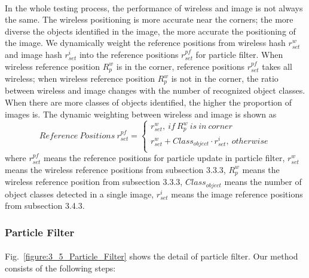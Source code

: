 \documentclass[a4paper,12pt]{report}
\begin{document}
\paragraph{}
In the whole testing process, the performance of wireless and image is not always the same. The wireless positioning is more accurate near the corners; the more diverse the objects identified in the image, the more accurate the positioning of the image. We dynamically weight the reference positions from wireless hash $r_{set}^{w}$ and image hash $r_{set}^{i}$ into the reference positions $r_{set}^{pf}$ for particle filter. When wireless reference position $R_p^{w}$ is in the corner, reference positions $r_{set}^{pf}$ takes all wireless; when wireless reference position $R_p^{w}$ is not in the corner, the ratio between wireless and image changes with the number of recognized object classes. When there are more classes of objects identified, the higher the proportion of images is. The dynamic weighting between wireless and image is shown as
\begin{equation}
\label{equation:Dynamic_Weighting}
Reference\ Positions\ r_{set}^{pf} = \left\{\begin{matrix}r_{set}^{w},\ if\ R_p^{w}\ is\ in\ corner\\r_{set}^{w} + Class_{object} \cdot r_{set}^{i} ,\ otherwise\\\end{matrix}\right.
\end{equation}
where $r_{set}^{pf}$ means the reference positions for particle update in particle filter, $r_{set}^{w}$ means the wireless reference positions from subsection 3.3.3, $R_p^{w}$ means the wireless reference position from subsection 3.3.3, $Class_{object}$ means the number of object classes detected in a single image, $r_{set}^{i}$ means the image reference positions from subsection 3.4.3.


\subsubsection{Particle Filter}
\paragraph{}
Fig.~\ref{figure:3_5_Particle_Filter} shows the detail of particle filter. Our method consists of the following steps:
\end{document}
